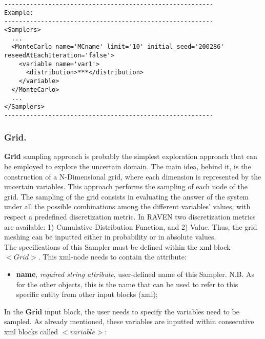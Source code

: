 \begin{lstlisting}[style=XML]
---------------------------------------------------------
Example:
---------------------------------------------------------
<Samplers>
  ...
  <MonteCarlo name='MCname' limit='10' initial_seed='200286' reseedAtEachIteration='false'> 
    <variable name='var1'> 
      <distribution>***</distribution> 	
    </variable> 
  </MonteCarlo>
  ...
</Samplers>
---------------------------------------------------------
\end{lstlisting}
\subsubsection{Grid.}
\label{subsubsubsec:Grid}
\textbf{Grid} sampling approach is probably the simplest exploration approach that can be employed to explore the uncertain domain. The main idea, behind it, is the construction of a N-Dimensional grid, where each dimension is represented by the uncertain variables. This approach performs the sampling of each node of the grid.  The sampling of the grid consists in evaluating the answer of the system under all the possible combinations among the different variables' values, with respect a predefined discretization metric.  In RAVEN two discretization metrics are available: 1) Cumulative Distribution Function, and 2) Value. Thus, the grid meshing can be inputted either in probability or in absolute values.
\\ The specifications of this Sampler must be defined within the xml block $<Grid>$. This xml-node needs to contain the attribute:
\vspace{-5mm}
\begin{itemize}
\itemsep0em
\item \textbf{name}, \textit{required string attribute}, user-defined name of this Sampler. N.B. As for the other objects, this is the name that can be used to refer to this specific entity from other input blocks (xml);
\end{itemize}
\vspace{-5mm}
In the \textbf{Grid} input block, the user needs to specify the variables need to be sampled. As already mentioned, these variables are inputted within consecutive xml blocks called $<variable>$:
